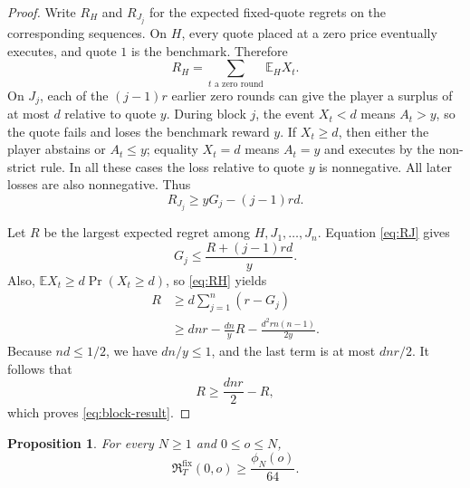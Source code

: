 \documentclass[11pt]{article}
\newtheorem{proposition}[theorem]{Proposition}
\theoremstyle{remark}
\newcommand{\E}{\mathbb E}
\newcommand{\Rstar}{\mathfrak R}
\begin{document}
\begin{proof}
Write $R_H$ and $R_{J_j}$ for the expected fixed-quote regrets on the
corresponding sequences.  On $H$, every quote placed at a zero price
eventually executes, and quote $1$ is the benchmark.  Therefore
\begin{equation}\label{eq:RH}
  R_H=\sum_{t\text{ a zero round}}\E_H X_t.
\end{equation}
On $J_j$, each of the $(j-1)r$ earlier zero rounds can give the player a
surplus of at most $d$ relative to quote $y$.  During block $j$, the event
$X_t<d$ means $A_t>y$, so the quote fails and loses the benchmark reward
$y$.  If $X_t\ge d$, then either the player abstains or $A_t\le y$; equality
$X_t=d$ means $A_t=y$ and executes by the non-strict rule.  In all these
cases the loss relative to quote $y$ is nonnegative.  All later losses are
also nonnegative.  Thus
\begin{equation}\label{eq:RJ}
  R_{J_j}\ge yG_j-(j-1)rd.
\end{equation}

Let $R$ be the largest expected regret among
$H,J_1,\ldots,J_n$.  Equation \eqref{eq:RJ} gives
\[
  G_j\le\frac{R+(j-1)rd}{y}.
\]
Also, $\E X_t\ge d\Pr(X_t\ge d)$, so \eqref{eq:RH} yields
\begin{align*}
  R
  &\ge d\sum_{j=1}^n(r-G_j)\\
  &\ge dnr-\frac{dn}{y}R
       -\frac{d^2rn(n-1)}{2y}.
\end{align*}
Because $nd\le1/2$, we have $dn/y\le1$, and the last term is at most
$dnr/2$.  It follows that
\[
  R\ge\frac{dnr}{2}-R,
\]
which proves \eqref{eq:block-result}.
\end{proof}

\begin{proposition}\label{prop:over-lower}
For every $N\ge1$ and $0\le o\le N$,
\[
  \Rstar_T^{\mathrm{fix}}(0,o)\ge\frac{\phi_N(o)}{64}.
\]
\end{proposition}
\end{document}
